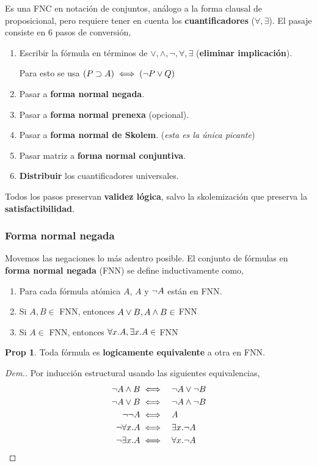 \documentclass{report}
\theoremstyle{definition} %
\newtheorem*{proposition*}{Prop}
\begin{document}
Es una FNC en notación de conjuntos, análogo a la forma clausal de
proposicional, pero requiere tener en cuenta los \textbf{cuantificadores}
($\forall, \exists$). El pasaje consiste en 6 pasos de conversión,

\begin{enumerate}
    \item Escribir la fórmula en términos de $\vee, \wedge, \neg, \forall,
    \exists$ (\textbf{eliminar implicación}).

    Para esto se usa $(P \supset A) \iff (\neg P \vee Q)$

    \item Pasar a \textbf{forma normal negada}.
    \item Pasar a \textbf{forma normal prenexa} (opcional).
    \item Pasar a \textbf{forma normal de Skolem}. (\textit{esta es la única
    picante})
    \item Pasar matriz a \textbf{forma normal conjuntiva}.
    \item \textbf{Distribuir} los cuantificadores universales.
\end{enumerate}

Todos los pasos preservan \textbf{validez lógica}, salvo la skolemización que
preserva la \textbf{satisfactibilidad}.

\subsubsection{Forma normal negada}

Movemos las negaciones lo más adentro posible. El conjunto de fórmulas en
\textbf{forma normal negada} (FNN) se define inductivamente como,

\begin{enumerate}
    \item Para cada fórmula atómica $A$, $A$ y $\neg A$ están en FNN.
    \item Si $A, B \in$ FNN, entonces $A \vee B, A \wedge B \in$ FNN
    \item Si $A\in$ FNN, entonces $\forall x . A, \exists x . A \in$ FNN
\end{enumerate}

\begin{proposition*}
    Toda fórmula es \textbf{logicamente equivalente} a otra en FNN.
\end{proposition*}
\begin{proof}[Dem.]
    Por inducción estructural usando las siguientes equivalencias,
    \begin{alignat*}{2}
        \neg A \wedge B &\iff &&\neg A \vee \neg B\\
        \neg A \vee B &\iff &&\neg A \wedge \neg B\\
        \neg \neg A &\iff &&A\\
        \neg \forall x . A &\iff &&\exists x . \neg A\\
        \neg \exists x . A &\iff &&\forall x . \neg A
    \end{alignat*}
\end{proof}
\end{document}
